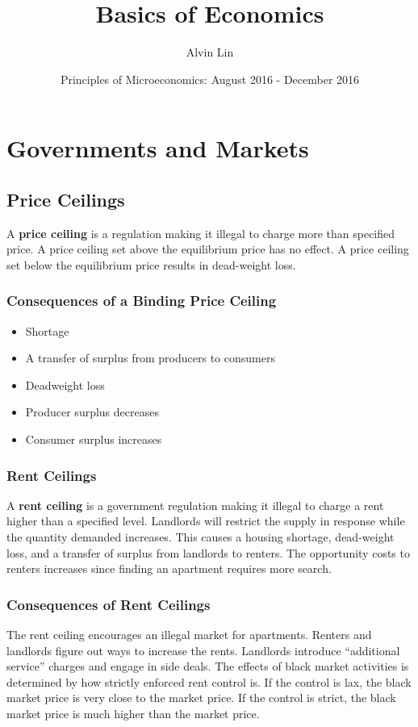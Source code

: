 \documentclass[letterpaper, 12pt]{article}
\title{Basics of Economics}
\author{Alvin Lin}
\date{Principles of Microeconomics: August 2016 - December 2016}
\begin{document}
\maketitle

\section{Governments and Markets}

\subsection{Price Ceilings}
A \textbf{price ceiling} is a regulation making it illegal to charge more than
specified price. A price ceiling set above the equilibrium price has no effect.
A price ceiling set below the equilibrium price results in dead-weight loss.

\subsubsection{Consequences of a Binding Price Ceiling}
\begin{itemize}
  \item Shortage
  \item A transfer of surplus from producers to consumers
  \item Deadweight loss
  \item Producer surplus decreases
  \item Consumer surplus increases
\end{itemize}

\subsubsection{Rent Ceilings}
A \textbf{rent ceiling} is a government regulation making it illegal to charge
a rent higher than a specified level. Landlords will restrict the supply in
response while the quantity demanded increases. This causes a housing shortage,
dead-weight loss, and a transfer of surplus from landlords to renters. The
opportunity costs to renters increases since finding an apartment requires more
search.

\subsubsection{Consequences of Rent Ceilings}
The rent ceiling encourages an illegal market for apartments. Renters and
landlords figure out ways to increase the rents. Landlords introduce
``additional service'' charges and engage in side deals. The effects of black
market activities is determined by how strictly enforced rent control is.
If the control is lax, the black market price is very close to the market price.
If the control is strict, the black market price is much higher than the market
price.
\end{document}
